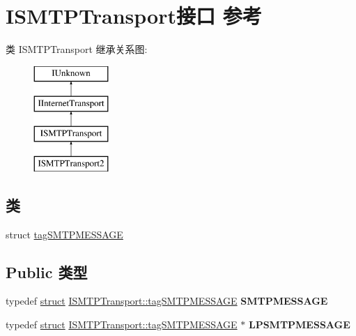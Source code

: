 \hypertarget{interface_i_s_m_t_p_transport}{}\section{I\+S\+M\+T\+P\+Transport接口 参考}
\label{interface_i_s_m_t_p_transport}
类 I\+S\+M\+T\+P\+Transport 继承关系图\+:\begin{figure}[H]
\begin{center}
\leavevmode
\includegraphics[height=4.000000cm]{interface_i_s_m_t_p_transport}
\end{center}
\end{figure}
\subsection*{类}
\begin{DoxyCompactItemize}
\item 
struct \hyperlink{struct_i_s_m_t_p_transport_1_1tag_s_m_t_p_m_e_s_s_a_g_e}{tag\+S\+M\+T\+P\+M\+E\+S\+S\+A\+GE}
\end{DoxyCompactItemize}
\subsection*{Public 类型}
\begin{DoxyCompactItemize}
\item 
\mbox{\label{interface_i_s_m_t_p_transport_a9a1c7f16892a26c1c661918b06cc6d8d}} 
typedef \hyperlink{interfacestruct}{struct} \hyperlink{struct_i_s_m_t_p_transport_1_1tag_s_m_t_p_m_e_s_s_a_g_e}{I\+S\+M\+T\+P\+Transport\+::tag\+S\+M\+T\+P\+M\+E\+S\+S\+A\+GE} {\bfseries S\+M\+T\+P\+M\+E\+S\+S\+A\+GE}
\item 
\mbox{\label{interface_i_s_m_t_p_transport_ab74e53469cf0919240b6cfe15ae08d35}} 
typedef \hyperlink{interfacestruct}{struct} \hyperlink{struct_i_s_m_t_p_transport_1_1tag_s_m_t_p_m_e_s_s_a_g_e}{I\+S\+M\+T\+P\+Transport\+::tag\+S\+M\+T\+P\+M\+E\+S\+S\+A\+GE} $\ast$ {\bfseries L\+P\+S\+M\+T\+P\+M\+E\+S\+S\+A\+GE}
\end{DoxyCompactItemize}
